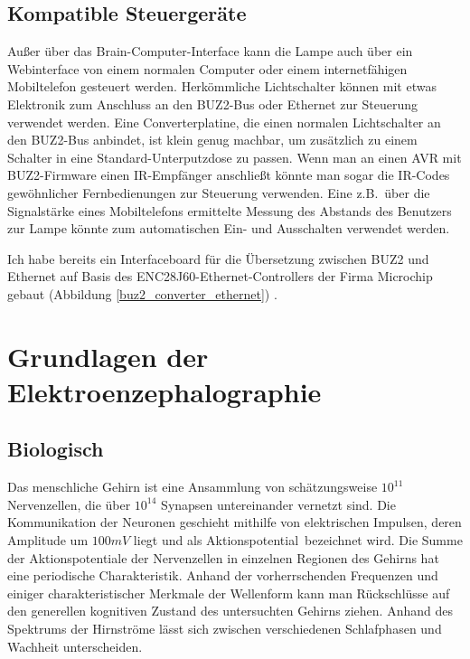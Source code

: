 \documentclass[12pt,a4paper,notitlepage]{article}
\begin{document}

\subsection{Kompatible Steuergeräte}
Außer über das Brain-Computer-Interface kann die Lampe auch über ein Webinterface von einem normalen Computer oder einem internetfähigen Mobiltelefon gesteuert werden. Herkömmliche Lichtschalter können mit etwas Elektronik zum Anschluss an den BUZ2-Bus oder Ethernet zur Steuerung verwendet werden. Eine Converterplatine, die einen normalen Lichtschalter an den BUZ2-Bus anbindet, ist klein genug machbar, um zusätzlich zu einem Schalter in eine Standard-Unterputzdose zu passen. Wenn man an einen AVR mit BUZ2-Firmware einen IR-Empfänger anschließt könnte man sogar die IR-Codes gewöhnlicher Fernbedienungen zur Steuerung verwenden. Eine z.B.\ über die Signalstärke eines Mobiltelefons ermittelte Messung des Abstands des Benutzers zur Lampe könnte zum automatischen Ein- und Ausschalten verwendet werden.

Ich habe bereits ein Interfaceboard für die Übersetzung zwischen BUZ2 und Ethernet auf Basis des ENC28J60-Ethernet-Controllers der Firma Microchip gebaut (Abbildung \ref{buz2_converter_ethernet}) \cite{MICROCHIP1}.
\section{Grundlagen der Elektroenzephalographie}
\subsection{Biologisch}
Das menschliche Gehirn ist eine Ansammlung von schätzungsweise $10^{11}$ Nervenzellen, die über $10^{14}$ Synapsen untereinander vernetzt sind. Die Kommunikation der Neuronen geschieht mithilfe von elektrischen Impulsen, deren Amplitude um $100mV$ liegt und als \glqq Aktionspotential\grqq\ bezeichnet wird. Die Summe der Aktionspotentiale der Nervenzellen in einzelnen Regionen des Gehirns hat eine periodische Charakteristik. Anhand der vorherrschenden Frequenzen und einiger charakteristischer Merkmale der Wellenform kann man Rückschlüsse auf den generellen kognitiven Zustand des untersuchten Gehirns ziehen. Anhand des Spektrums der Hirnströme lässt sich zwischen verschiedenen Schlafphasen und Wachheit unterscheiden\cite{WP14,WP15,WP16,WP17,WP18,WP19}.
\end{document}
